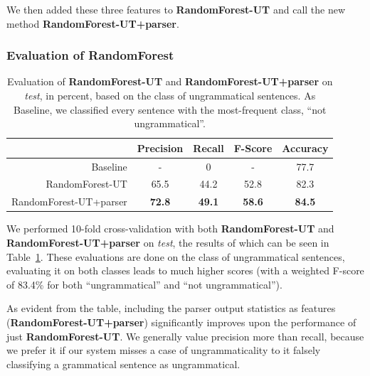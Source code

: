 \documentclass[a4paper,10pt]{scrartcl}
\theoremstyle{style}
\begin{document}
We then added these three features to \textbf{RandomForest-UT} and call the new method \textbf{RandomForest-UT+parser}.

\subsubsection{Evaluation of RandomForest}

\begin{table}
\begin{center}
\begin{tabular}{|r|c|c|c|c|}
  \hline
  & \textbf{Precision} & \textbf{Recall} & \textbf{F-Score} & \textbf{Accuracy}\\
  \hline
  Baseline & - & 0 & - & 77.7\\
  \hline
  RandomForest-UT & 65.5 & 44.2 & 52.8 & 82.3\\
  \hline
  RandomForest-UT+parser & \textbf{72.8} & \textbf{49.1} & \textbf{58.6} & \textbf{84.5}\\
  \hline
  \end{tabular}
\end{center}
\caption{Evaluation of \textbf{RandomForest-UT} and \textbf{RandomForest-UT+parser} on \textit{test}, in percent, based on the class of ungrammatical sentences. As Baseline, we classified every sentence with the most-frequent class, ``not ungrammatical''.}
\label{eval_randomforest}
\end{table}


We performed 10-fold cross-validation with both \textbf{RandomForest-UT} and \textbf{RandomForest-UT+parser} on \textit{test}, the results of which can be seen in Table~\ref{eval_randomforest}. These evaluations are done on the class of ungrammatical sentences, evaluating it on both classes leads to much higher scores (with a weighted F-score of 83.4\% for both ``ungrammatical'' and ``not ungrammatical'').

As evident from the table, including the parser output statistics as features (\textbf{RandomForest-UT+parser}) significantly improves upon the performance of just \textbf{RandomForest-UT}. We generally value precision more than recall, because we prefer it if our system misses a case of ungrammaticality to it falsely classifying a grammatical sentence as ungrammatical.
\end{document}
